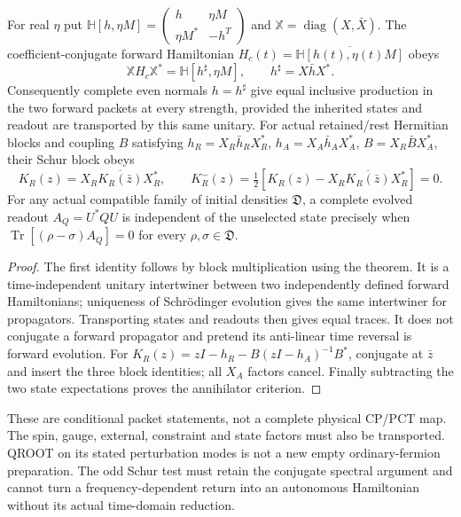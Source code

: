 \documentclass[11pt,a4paper]{article}
\begin{document}
\begin{proposition}
\label{p5c:prop:v2217-complete-family-packet}
For real $\eta$ put
$\mathbb H[h,\eta M]=\left(\begin{smallmatrix}h&\eta M\\
\eta M^*&-h^T\end{smallmatrix}\right)$ and
$\mathbb X=\operatorname{diag}(X,\bar X)$.
The coefficient-conjugate forward Hamiltonian
$H_c(t)=\overline{\mathbb H[h(t),\eta(t)M]}$ obeys
\[
 \mathbb X H_c\mathbb X^*
       =\mathbb H[h^\sharp,\eta M],\qquad h^\sharp=X\bar hX^*.
\]
Consequently complete even normals $h=h^\sharp$ give equal inclusive
production in the two forward packets at every strength, provided the
inherited states and readout are transported by this same unitary.
For actual retained/rest Hermitian blocks and coupling $B$ satisfying
$h_R=X_R\bar h_RX_R^*$, $h_A=X_A\bar h_AX_A^*$,
$B=X_R\bar B X_A^*$, their Schur block obeys
\[
 K_R(z)=X_R\overline{K_R(\bar z)}X_R^*,\qquad
 K_R^-(z)=\tfrac12[K_R(z)-X_R\overline{K_R(\bar z)}X_R^*]=0.
\]
For any actual compatible family of initial densities $\mathfrak D$, a
complete evolved readout $A_Q=U^*QU$ is independent of the unselected
state precisely when
$\operatorname{Tr}[(\rho-\sigma)A_Q]=0$ for every
$\rho,\sigma\in\mathfrak D$.
\end{proposition}
\begin{proof}
The first identity follows by block multiplication using the theorem.
It is a time-independent unitary intertwiner between two independently
defined forward Hamiltonians; uniqueness of Schr\"odinger evolution gives
the same intertwiner for propagators. Transporting states and readouts
then gives equal traces. It does not conjugate a forward propagator and
pretend its anti-linear time reversal is forward evolution.
For $K_R(z)=zI-h_R-B(zI-h_A)^{-1}B^*$, conjugate at $\bar z$ and insert
the three block identities; all $X_A$ factors cancel. Finally subtracting
the two state expectations proves the annihilator criterion.
\end{proof}
These are conditional packet statements, not a complete physical CP/PCT
map. The spin, gauge, external, constraint and state factors must also be
transported. QROOT on its stated perturbation modes is not a new empty
ordinary-fermion preparation. The odd Schur test must retain the conjugate
spectral argument and cannot turn a frequency-dependent return into an
autonomous Hamiltonian without its actual time-domain reduction.
\end{document}
